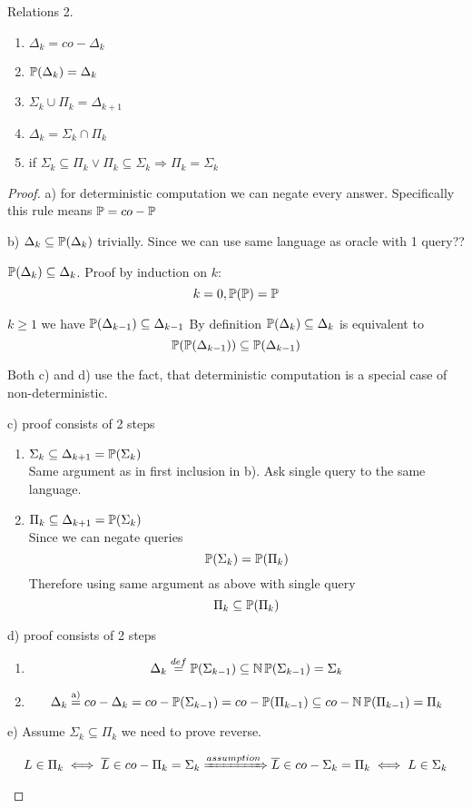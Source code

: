 \begin{theorem} Relations 2.
	\begin{enumerate}[label=\alph*)]
		\item $\Delta_k = co-\Delta_k$
		\item $\operatorname{\mathbb{P}}(\Delta_k) = \Delta_k$
		\item $\Sigma_k \cup \Pi_k = \Delta_{k + 1}$
		\item $\Delta_k = \Sigma_k \cap \Pi_k$
		\item if $\Sigma_k \subseteq \Pi_k \lor \Pi_k \subseteq \Sigma_k \Rightarrow \Pi_k = \Sigma_k$
	\end{enumerate}
\end{theorem}
\begin{proof}
	a) for deterministic computation we can negate every answer.
	Specifically this rule means $\operatorname{\mathbb{P}} = co-\operatorname{\mathbb{P}}$

	b) $\Delta_k \subseteq \operatorname{\mathbb{P}}(\Delta_k)$ trivially. Since we can use same language as oracle with 1 query??

	$\operatorname{\mathbb{P}}(\Delta_k) \subseteq \Delta_k$. Proof by induction on $k$:
	\[ k = 0, \operatorname{\mathbb{P}}(\operatorname{\mathbb{P}}) = \operatorname{\mathbb{P}} \]

	$k \geq 1$ we have $\operatorname{\mathbb{P}}(\Delta_{k - 1}) \subseteq \Delta_{k - 1}$
	By definition $\operatorname{\mathbb{P}}(\Delta_k) \subseteq \Delta_k$ is equivalent to
	\[ \operatorname{\mathbb{P}}(\operatorname{\mathbb{P}}(\Delta_{k - 1})) \subseteq \operatorname{\mathbb{P}}(\Delta_{k - 1}) \]

	Both c) and d) use the fact, that deterministic computation is a special case of non-deterministic.

	c) proof consists of 2 steps
	\begin{enumerate}
		\item $\Sigma_k \subseteq \Delta_{k + 1} = \operatorname{\mathbb{P}}(\Sigma_k)$\\
			Same argument as in first inclusion in b).
			Ask single query to the same language.
		\item $\Pi_k \subseteq \Delta_{k + 1} = \operatorname{\mathbb{P}}(\Sigma_k)$\\
			Since we can negate queries
			\[ \operatorname{\mathbb{P}}(\Sigma_k) = \operatorname{\mathbb{P}}(\Pi_k) \]
			Therefore using same argument as above with single query
			\[ \Pi_k \subseteq \operatorname{\mathbb{P}}(\Pi_k) \]
	\end{enumerate}

	d) proof consists of 2 steps
	\begin{enumerate}
		\item
			\[ \Delta_k \stackrel{def}{=} \operatorname{\mathbb{P}}(\Sigma_{k - 1}) \subseteq \operatorname{\operatorname{\mathbb{N}}\mathbb{P}}(\Sigma_{k - 1}) = \Sigma_k \]
		\item
			\[ \Delta_k \stackrel{\text{a)}}{=} co-\Delta_k = co-\operatorname{\mathbb{P}}(\Sigma_{k - 1}) = co-\operatorname{\mathbb{P}}(\Pi_{k - 1}) \subseteq co-\operatorname{\operatorname{\mathbb{N}}\mathbb{P}}(\Pi_{k - 1}) = \Pi_k \]
	\end{enumerate}

	e) Assume $\Sigma_k \subseteq \Pi_k$ we need to prove reverse.

	\[ L \in \Pi_k \iff \overline{L} \in co-\Pi_k = \Sigma_k \xRightarrow{assumption} \overline{L} \in co-\Sigma_k = \Pi_k \iff L \in \Sigma_k  \]
\end{proof}

